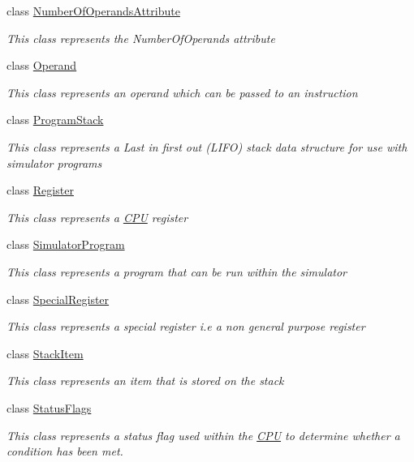 \begin{DoxyCompactItemize}
class \hyperlink{class_c_p_u___o_s___simulator_1_1_c_p_u_1_1_number_of_operands_attribute}{Number\+Of\+Operands\+Attribute}
\begin{DoxyCompactList}\small\item\em This class represents the Number\+Of\+Operands attribute \end{DoxyCompactList}\item 
class \hyperlink{class_c_p_u___o_s___simulator_1_1_c_p_u_1_1_operand}{Operand}
\begin{DoxyCompactList}\small\item\em This class represents an operand which can be passed to an instruction \end{DoxyCompactList}\item 
class \hyperlink{class_c_p_u___o_s___simulator_1_1_c_p_u_1_1_program_stack}{Program\+Stack}
\begin{DoxyCompactList}\small\item\em This class represents a Last in first out (L\+I\+F\+O) stack data structure for use with simulator programs \end{DoxyCompactList}\item 
class \hyperlink{class_c_p_u___o_s___simulator_1_1_c_p_u_1_1_register}{Register}
\begin{DoxyCompactList}\small\item\em This class represents a \hyperlink{namespace_c_p_u___o_s___simulator_1_1_c_p_u}{C\+P\+U} register \end{DoxyCompactList}\item 
class \hyperlink{class_c_p_u___o_s___simulator_1_1_c_p_u_1_1_simulator_program}{Simulator\+Program}
\begin{DoxyCompactList}\small\item\em This class represents a program that can be run within the simulator \end{DoxyCompactList}\item 
class \hyperlink{class_c_p_u___o_s___simulator_1_1_c_p_u_1_1_special_register}{Special\+Register}
\begin{DoxyCompactList}\small\item\em This class represents a special register i.\+e a non general purpose register \end{DoxyCompactList}\item 
class \hyperlink{class_c_p_u___o_s___simulator_1_1_c_p_u_1_1_stack_item}{Stack\+Item}
\begin{DoxyCompactList}\small\item\em This class represents an item that is stored on the stack \end{DoxyCompactList}\item 
class \hyperlink{class_c_p_u___o_s___simulator_1_1_c_p_u_1_1_status_flags}{Status\+Flags}
\begin{DoxyCompactList}\small\item\em This class represents a status flag used within the \hyperlink{namespace_c_p_u___o_s___simulator_1_1_c_p_u}{C\+P\+U} to determine whether a condition has been met. \end{DoxyCompactList}\end{DoxyCompactItemize}
